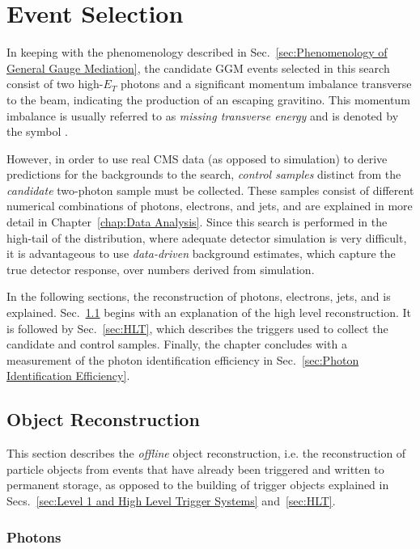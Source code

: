 \documentclass[dissertation.tex]{subfiles}
\begin{document}
\chapter{Event Selection}
\label{chap:Event Selection}

In keeping with the phenomenology described in Sec.~\ref{sec:Phenomenology of General Gauge Mediation}, the candidate GGM events selected in this search consist of two high-$E_{T}$ photons and a significant momentum imbalance transverse to the beam, indicating the production of an escaping gravitino.  This momentum imbalance is usually referred to as \textit{missing transverse energy} and is denoted by the symbol \MET.

However, in order to use real CMS data (as opposed to simulation) to derive predictions for the backgrounds to the search, \textit{control samples} distinct from the \textit{candidate} two-photon sample must be collected.  These samples consist of different numerical combinations of photons, electrons, and jets, and are explained in more detail in Chapter~\ref{chap:Data Analysis}.  Since this search is performed in the high-\MET tail of the \MET distribution, where adequate detector simulation is very difficult, it is advantageous to use \textit{data-driven} background estimates, which capture the true detector response, over numbers derived from simulation.

In the following sections, the reconstruction of photons, electrons, jets, and \MET is explained.  Sec.~\ref{sec:Object Reconstruction} begins with an explanation of the high level reconstruction.  It is followed by Sec.~\ref{sec:HLT}, which describes the triggers used to collect the candidate and control samples.  Finally, the chapter concludes with a measurement of the photon identification efficiency in Sec.~\ref{sec:Photon Identification Efficiency}.

\section{Object Reconstruction}
\label{sec:Object Reconstruction}

This section describes the \textit{offline} object reconstruction, i.e. the reconstruction of particle objects from events that have already been triggered and written to permanent storage, as opposed to the building of trigger objects explained in Secs.~\ref{sec:Level 1 and High Level Trigger Systems} and~\ref{sec:HLT}.

\subsection{Photons}
\label{sec:Photons}
\end{document}
